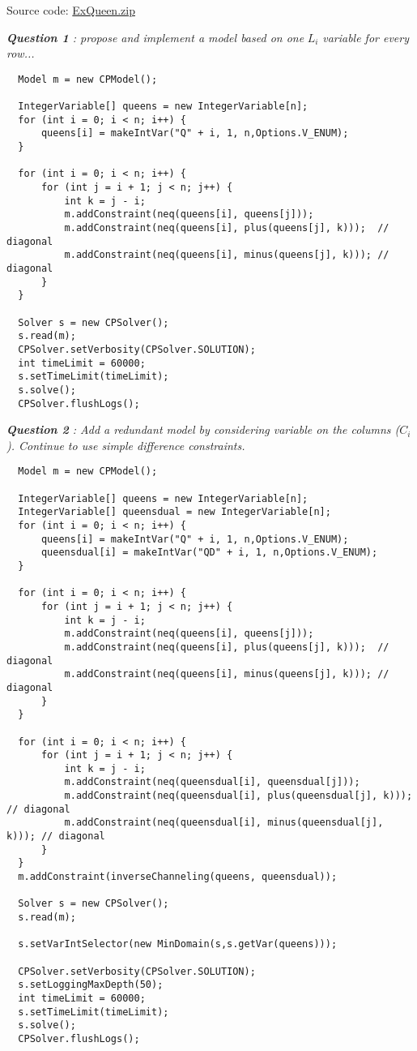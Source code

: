 Source code: \href{media/zip/exqueen.zip}{ExQueen.zip}

\noindent\emph{\textbf{Question 1} : propose and implement a model based on one} $L_{i}$ \emph{variable for every row...}
\begin{lstlisting}
  Model m = new CPModel();
  
  IntegerVariable[] queens = new IntegerVariable[n];
  for (int i = 0; i < n; i++) {
      queens[i] = makeIntVar("Q" + i, 1, n,Options.V_ENUM);
  }
	
  for (int i = 0; i < n; i++) {
      for (int j = i + 1; j < n; j++) {
          int k = j - i;
          m.addConstraint(neq(queens[i], queens[j]));
          m.addConstraint(neq(queens[i], plus(queens[j], k)));  // diagonal
          m.addConstraint(neq(queens[i], minus(queens[j], k))); // diagonal
      }
  }
	
  Solver s = new CPSolver();
  s.read(m);
  CPSolver.setVerbosity(CPSolver.SOLUTION);
  int timeLimit = 60000;
  s.setTimeLimit(timeLimit);
  s.solve();
  CPSolver.flushLogs();
\end{lstlisting}

\noindent\emph{\textbf{Question 2} : Add a redundant model by considering variable on the columns ($C_i$). Continue to use simple difference constraints.}

\begin{lstlisting}
  Model m = new CPModel();
	
  IntegerVariable[] queens = new IntegerVariable[n];
  IntegerVariable[] queensdual = new IntegerVariable[n];
  for (int i = 0; i < n; i++) {
      queens[i] = makeIntVar("Q" + i, 1, n,Options.V_ENUM);
      queensdual[i] = makeIntVar("QD" + i, 1, n,Options.V_ENUM);
  }
	
  for (int i = 0; i < n; i++) {
      for (int j = i + 1; j < n; j++) {
          int k = j - i;
          m.addConstraint(neq(queens[i], queens[j]));
          m.addConstraint(neq(queens[i], plus(queens[j], k)));  // diagonal
          m.addConstraint(neq(queens[i], minus(queens[j], k))); // diagonal
      }
  }

  for (int i = 0; i < n; i++) {
      for (int j = i + 1; j < n; j++) {
          int k = j - i;
          m.addConstraint(neq(queensdual[i], queensdual[j]));
          m.addConstraint(neq(queensdual[i], plus(queensdual[j], k)));  // diagonal
          m.addConstraint(neq(queensdual[i], minus(queensdual[j], k))); // diagonal
      }
  }
  m.addConstraint(inverseChanneling(queens, queensdual));
  
  Solver s = new CPSolver();
  s.read(m);
  
  s.setVarIntSelector(new MinDomain(s,s.getVar(queens)));
  
  CPSolver.setVerbosity(CPSolver.SOLUTION);
  s.setLoggingMaxDepth(50);
  int timeLimit = 60000;
  s.setTimeLimit(timeLimit);
  s.solve();
  CPSolver.flushLogs();
\end{lstlisting}

